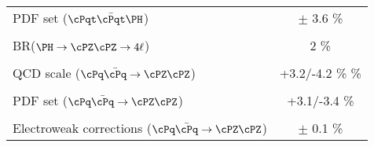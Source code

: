 \begin{table}[!htb]
\begin{center}
\begin{tabular}{|lc|}
PDF set (${\rm \ttH}$) & $\pm$ 3.6 \% \\
\vspace{-0.4cm} & \\
BR($\HZZfl$) & 2 \% \\
\hline %
\vspace{-0.4cm} & \\
QCD scale ($\qqZZ$) & +3.2/-4.2 \% \% \\
\vspace{-0.4cm} & \\
PDF set ($\qqZZ$) & +3.1/-3.4 \% \\
\vspace{-0.4cm} & \\
Electroweak corrections ($\qqZZ$) & $\pm$ 0.1 \% \\
\hline %
\hline %
\end{tabular}
\normalsize
\end{center}
\end{table}

